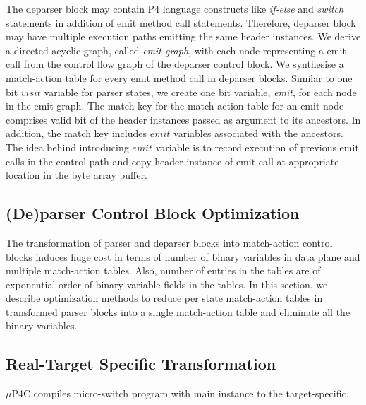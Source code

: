 The deparser block may contain P4 language constructs like \emph{if-else} and \emph{switch} statements in addition of emit method call statements.
Therefore, deparser block may have multiple execution paths emitting the same header instances. 
We derive a directed-acyclic-graph, called \emph{emit graph}, with each node representing a emit call from the control flow graph of the deparser control block.
We synthesise a match-action table for every emit method call in deparser blocks.
Similar to one bit $visit$ variable for parser states, we create one bit variable, \emph{emit}, for each node in the emit graph.
The match key for the match-action table for an emit node comprises valid bit of the header instances passed as argument to its ancestors.
In addition, the match key includes $emit$ variables associated with the ancestors.
The idea behind introducing $emit$ variable is to record execution of previous emit calls in the control path and copy header instance  of emit call at appropriate location in the byte array buffer.



\subsection{(De)parser Control Block Optimization}
The transformation of parser and deparser blocks into match-action control blocks induces huge cost in terms of number of binary variables in data plane and multiple match-action tables.
Also, number of entries in the tables are of exponential order of binary variable fields in the tables.
In this section, we describe optimization methods to reduce per state match-action tables in transformed parser blocks into a single match-action table and eliminate all the binary variables.
 

\subsection{Real-Target Specific Transformation}
$\mu$P4C compiles micro-switch program with main instance to the target-specific.

